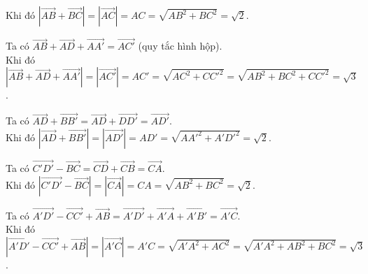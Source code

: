 \begin{bt}
{\begin{listEX}[1]
    Khi đó $\left|\overrightarrow{AB}+\overrightarrow{BC}\right|=\left|\overrightarrow{AC}\right|=AC=\sqrt{AB^2+BC^2}=\sqrt{2}$.
    \item Ta có $\overrightarrow{AB}+\overrightarrow{AD}+\overrightarrow{AA'}=\overrightarrow{AC'}$ (quy tắc hình hộp).\\
    Khi đó $\left|\overrightarrow{AB}+\overrightarrow{AD}+\overrightarrow{AA'}\right|=\left|\overrightarrow{AC'}\right|=AC'=\sqrt{AC^2+CC'^2}=\sqrt{AB^2+BC^2+CC'^2}=\sqrt{3}$.
    \item Ta có $\overrightarrow{AD}+\overrightarrow{BB'}=\overrightarrow{AD}+\overrightarrow{DD'}=\overrightarrow{AD'}$. \\
    Khi đó $\left|\overrightarrow{AD}+\overrightarrow{BB'}\right|=\left|\overrightarrow{AD'}\right|=AD'=\sqrt{AA'^2+A'D'^2}=\sqrt{2}$.
    \item Ta có $\overrightarrow{C'D'}-\overrightarrow{BC}=\overrightarrow{CD}+\overrightarrow{CB}=\overrightarrow{CA}$.\\
    Khi đó $\left|\overrightarrow{C'D'}-\overrightarrow{BC}\right|=\left|\overrightarrow{CA}\right|=CA=\sqrt{AB^2+BC^2}=\sqrt{2}$.
    \item Ta có $\overrightarrow{A'D'}-\overrightarrow{CC'}+\overrightarrow{AB}=\overrightarrow{A'D'}+\overrightarrow{A'A}+\overrightarrow{A'B'}=\overrightarrow{A'C}$.\\
    Khi đó $\left|\overrightarrow{A'D'}-\overrightarrow{CC'}+\overrightarrow{AB}\right|=\left|\overrightarrow{A'C}\right|=A'C=\sqrt{A'A^2+AC^2}=\sqrt{A'A^2+AB^2+BC^2}=\sqrt{3}$.
\end{listEX}
 }
\end{bt}


